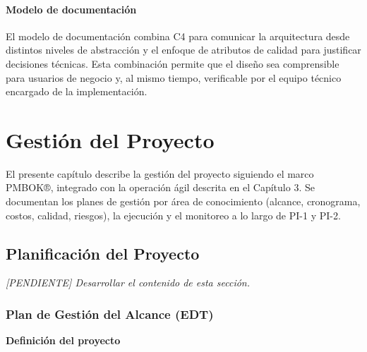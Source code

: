 \documentclass[12pt,a4paper,oneside]{report}
\begin{document}
\subsubsection{Modelo de documentación}\label{subsubsec:modelo-documentacion}

El modelo de documentación combina C4 para comunicar la arquitectura desde distintos niveles de abstracción y el enfoque de atributos de calidad para justificar decisiones técnicas. Esta combinación permite que el diseño sea comprensible para usuarios de negocio y, al mismo tiempo, verificable por el equipo técnico encargado de la implementación.


\chapter{Gestión del Proyecto}\label{cap:7-gestion-del-proyecto}

El presente capítulo describe la gestión del proyecto siguiendo el marco PMBOK®, integrado con la operación ágil descrita en el Capítulo 3. Se documentan los planes de gestión por área de conocimiento (alcance, cronograma, costos, calidad, riesgos), la ejecución y el monitoreo a lo largo de PI-1 y PI-2.

\section{Planificación del Proyecto}\label{sec:planificacion-del-proyecto}

\textit{[PENDIENTE] Desarrollar el contenido de esta sección.}

\subsection{Plan de Gestión del Alcance (EDT)}\label{subsec:plan-de-gestion-del-alcance-edt}

\textbf{Definición del proyecto}
\end{document}
